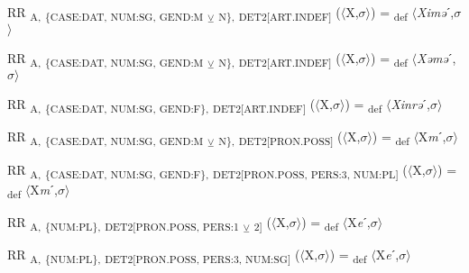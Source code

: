 {\begin{exe}
 RR \textsubscript{A,} \textsubscript{\{CASE:DAT, NUM:SG, GEND:M} \textsubscript{${\veebar}$}\textsubscript{ N\},} \textsubscript{DET2[ART.INDEF]} ($\langle$X,$\sigma $$\rangle$) = \textsubscript{def} $\langle$\textit{Ximə}ˊ,$\sigma $$\rangle$
\end{exe}

\begin{exe}
 RR \textsubscript{A,} \textsubscript{\{CASE:DAT, NUM:SG, GEND:M} \textsubscript{${\veebar}$}\textsubscript{ N\},} \textsubscript{DET2[ART.INDEF]} ($\langle$X,$\sigma $$\rangle$) = \textsubscript{def} $\langle$\textit{Xəmə}ˊ,$\sigma $$\rangle$
\end{exe}

\begin{exe}
 RR \textsubscript{A,} \textsubscript{\{CASE:DAT, NUM:SG, GEND:F\},} \textsubscript{DET2[ART.INDEF]} ($\langle$X,$\sigma $$\rangle$) = \textsubscript{def} $\langle$\textit{Xinrə}ˊ,$\sigma $$\rangle$
\end{exe}

\begin{exe}
 RR \textsubscript{A,} \textsubscript{\{CASE:DAT, NUM:SG, GEND:M} \textsubscript{${\veebar}$}\textsubscript{ N\},} \textsubscript{DET2[PRON.POSS]} ($\langle$X,$\sigma $$\rangle$) = \textsubscript{def} $\langle$X\textit{m}ˊ,$\sigma $$\rangle$
\end{exe}

\begin{exe}
 RR \textsubscript{A,} \textsubscript{\{CASE:DAT, NUM:SG, GEND:F\},} \textsubscript{DET2[PRON.POSS, PERS:3, NUM:PL]} ($\langle$X,$\sigma $$\rangle$) = \textsubscript{def} $\langle$X\textit{m}ˊ,$\sigma $$\rangle$
\end{exe}

\begin{exe}
 RR \textsubscript{A,} \textsubscript{\{NUM:PL\},} \textsubscript{DET2[PRON.POSS, PERS:1} \textsubscript{${\veebar}$}\textsubscript{ 2]} ($\langle$X,$\sigma $$\rangle$) = \textsubscript{def} $\langle$X\textit{e}ˊ,$\sigma $$\rangle$
\end{exe}

\begin{exe}
 RR \textsubscript{A,} \textsubscript{\{NUM:PL\},} \textsubscript{DET2[PRON.POSS, PERS:3, NUM:SG]} ($\langle$X,$\sigma $$\rangle$) = \textsubscript{def} $\langle$X\textit{e}ˊ,$\sigma $$\rangle$
\end{exe}

}
